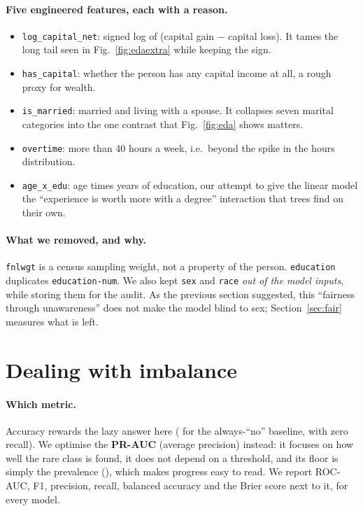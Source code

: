 \documentclass[11pt,a4paper]{article}
\begin{document}
\paragraph{Five engineered features, each with a reason.}
\begin{itemize}
\item \texttt{log\_capital\_net}: signed log of (capital gain $-$ capital loss). It tames the long tail seen in Fig.~\ref{fig:edaextra} while keeping the sign.
\item \texttt{has\_capital}: whether the person has any capital income at all, a rough proxy for wealth.
\item \texttt{is\_married}: married and living with a spouse. It collapses seven marital categories into the one contrast that Fig.~\ref{fig:eda} shows matters.
\item \texttt{overtime}: more than 40 hours a week, i.e.\ beyond the spike in the hours distribution.
\item \texttt{age\_x\_edu}: age times years of education, our attempt to give the linear model the ``experience is worth more with a degree'' interaction that trees find on their own.
\end{itemize}

\paragraph{What we removed, and why.} \texttt{fnlwgt} is a census sampling weight, not a property of the person. \texttt{education} duplicates \texttt{education-num}. We also kept \texttt{sex} and \texttt{race} \emph{out of the model inputs}, while storing them for the audit. As the previous section suggested, this ``fairness through unawareness'' does not make the model blind to sex; Section~\ref{sec:fair} measures what is left.

\section{Dealing with imbalance}\label{sec:imb}
\paragraph{Which metric.} Accuracy rewards the lazy answer here (\BaseAcc{} for the always-``no'' baseline, with zero recall). We optimise the \textbf{PR-AUC} (average precision) instead: it focuses on how well the rare class is found, it does not depend on a threshold, and its floor is simply the prevalence (\BasePr), which makes progress easy to read. We report ROC-AUC, F1, precision, recall, balanced accuracy and the Brier score next to it, for every model.
\end{document}
